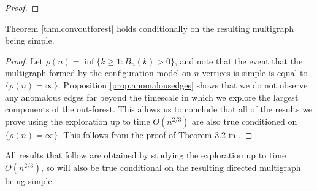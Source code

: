 \begin{proof}


\end{proof}
\begin{corollary}
 Theorem \ref{thm.convoutforest} holds conditionally on the resulting multigraph being simple. 
\end{corollary}
\begin{proof}
Let $\rho(n)=\inf\{k\geq 1:B_n(k)>0\}$, and note that the event that the multigraph formed by the configuration model on $n$ vertices is simple is equal to $\{\rho(n)=\infty\}$. Proposition \ref{prop.anomalousedges} shows that we do not observe any anomalous edges far beyond the timescale in which we explore the largest components of the out-forest. This allows us to conclude that all of the results we prove using the exploration up to time $O(n^{2/3})$ are also true conditioned on $\{\rho(n)=\infty\}$. This follows from the proof of Theorem 3.2 in \cite{josephComponentSizesCritical2014}.
\end{proof}
All results that follow are obtained by studying the exploration up to time $O(n^{2/3})$, so will also be true conditional on the resulting directed multigraph being simple.

